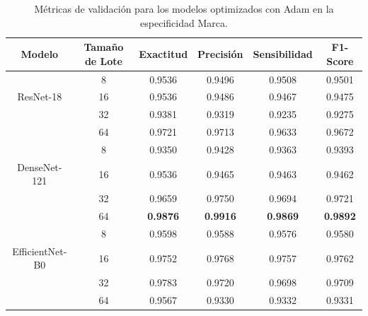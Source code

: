 \begin{table}[H]
	\begin{adjustbox}
		{width=1\textwidth}
		\begin{tabular}{|c|c|c|c|c|c|}
			\hline
			\textbf{Modelo}             & \textbf{Tamaño de Lote} & \textbf{Exactitud} & \textbf{Precisión} & \textbf{Sensibilidad} & \textbf{F1-Score} \\
			\hline
			& 8                       & 0.9536             & 0.9496             & 0.9508                & 0.9501            \\
			\cline{2-6} ResNet-18       & 16                      & 0.9536             & 0.9486             & 0.9467                & 0.9475            \\
			\cline{2-6}                 & 32                      & 0.9381             & 0.9319             & 0.9235                & 0.9275            \\
			\cline{2-6}                 & 64                      & 0.9721             & 0.9713             & 0.9633                & 0.9672            \\
			\hline
			& 8                       & 0.9350             & 0.9428             & 0.9363                & 0.9393            \\
			\cline{2-6} DenseNet-121    & 16                      & 0.9536             & 0.9465             & 0.9463                & 0.9462            \\
			\cline{2-6}                 & 32                      & 0.9659             & 0.9750             & 0.9694                & 0.9721            \\
			\cline{2-6}                 & 64                      & \textbf{0.9876}    & \textbf{0.9916}    & \textbf{0.9869}       & \textbf{0.9892}   \\
			\hline
			& 8                       & 0.9598             & 0.9588             & 0.9576                & 0.9580            \\
			\cline{2-6} EfficientNet-B0 & 16                      & 0.9752             & 0.9768             & 0.9757                & 0.9762            \\
			\cline{2-6}                 & 32                      & 0.9783             & 0.9720             & 0.9698                & 0.9709            \\
			\cline{2-6}                 & 64                      & 0.9567             & 0.9330             & 0.9332                & 0.9331            \\
			\hline
		\end{tabular}
	\end{adjustbox}
	\caption{Métricas de validación para los modelos optimizados con Adam en la
		especificidad Marca.}
	\label{tab:adam_metrics-marca}
\end{table}

